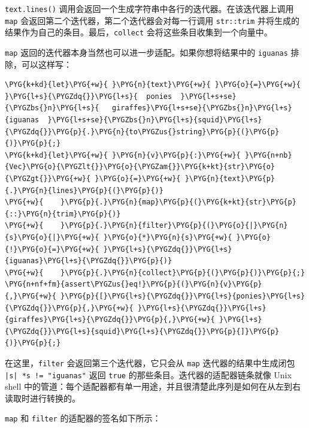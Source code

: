 \texttt{text.lines()} 调用会返回一个生成字符串中各行的迭代器。在该迭代器上调用 \texttt{map} 会返回第二个迭代器，第二个迭代器会对每一行调用 \texttt{str::trim} 并将生成的结果作为自己的条目。最后，\texttt{collect} 会将这些条目收集到一个向量中。

\texttt{map} 返回的迭代器本身当然也可以进一步适配。如果你想将结果中的 \texttt{iguanas} 排除，可以这样写：

\begin{Verbatim}[commandchars=\\\{\},breaklines=true,breakanywhere=true,fontsize=\codefont,xleftmargin=17bp]
\PYG{k+kd}{let}\PYG{+w}{ }\PYG{n}{text}\PYG{+w}{ }\PYG{o}{=}\PYG{+w}{ }\PYG{l+s}{\PYGZdq{}}\PYG{l+s}{  ponies  }\PYG{l+s+se}{\PYGZbs{}n}\PYG{l+s}{   giraffes}\PYG{l+s+se}{\PYGZbs{}n}\PYG{l+s}{iguanas  }\PYG{l+s+se}{\PYGZbs{}n}\PYG{l+s}{squid}\PYG{l+s}{\PYGZdq{}}\PYG{p}{.}\PYG{n}{to\PYGZus{}string}\PYG{p}{(}\PYG{p}{)}\PYG{p}{;}
\PYG{k+kd}{let}\PYG{+w}{ }\PYG{n}{v}\PYG{p}{:}\PYG{+w}{ }\PYG{n+nb}{Vec}\PYG{o}{\PYGZlt{}}\PYG{o}{\PYGZam{}}\PYG{k+kt}{str}\PYG{o}{\PYGZgt{}}\PYG{+w}{ }\PYG{o}{=}\PYG{+w}{ }\PYG{n}{text}\PYG{p}{.}\PYG{n}{lines}\PYG{p}{(}\PYG{p}{)}
\PYG{+w}{    }\PYG{p}{.}\PYG{n}{map}\PYG{p}{(}\PYG{k+kt}{str}\PYG{p}{::}\PYG{n}{trim}\PYG{p}{)}
\PYG{+w}{    }\PYG{p}{.}\PYG{n}{filter}\PYG{p}{(}\PYG{o}{|}\PYG{n}{s}\PYG{o}{|}\PYG{+w}{ }\PYG{o}{*}\PYG{n}{s}\PYG{+w}{ }\PYG{o}{!}\PYG{o}{=}\PYG{+w}{ }\PYG{l+s}{\PYGZdq{}}\PYG{l+s}{iguanas}\PYG{l+s}{\PYGZdq{}}\PYG{p}{)}
\PYG{+w}{    }\PYG{p}{.}\PYG{n}{collect}\PYG{p}{(}\PYG{p}{)}\PYG{p}{;}
\PYG{n+nf+fm}{assert\PYGZus{}eq!}\PYG{p}{(}\PYG{n}{v}\PYG{p}{,}\PYG{+w}{ }\PYG{p}{[}\PYG{l+s}{\PYGZdq{}}\PYG{l+s}{ponies}\PYG{l+s}{\PYGZdq{}}\PYG{p}{,}\PYG{+w}{ }\PYG{l+s}{\PYGZdq{}}\PYG{l+s}{giraffes}\PYG{l+s}{\PYGZdq{}}\PYG{p}{,}\PYG{+w}{ }\PYG{l+s}{\PYGZdq{}}\PYG{l+s}{squid}\PYG{l+s}{\PYGZdq{}}\PYG{p}{]}\PYG{p}{)}\PYG{p}{;}
\end{Verbatim}

在这里，\texttt{filter} 会返回第三个迭代器，它只会从 \texttt{map} 迭代器的结果中生成闭包 \texttt{|s| *s != "iguanas"} 返回 \texttt{true} 的那些条目。迭代器的适配器链条就像 Unix shell 中的管道：每个适配器都有单一用途，并且很清楚此序列是如何在从左到右读取时进行转换的。

\texttt{map} 和 \texttt{filter} 的适配器的签名如下所示：

